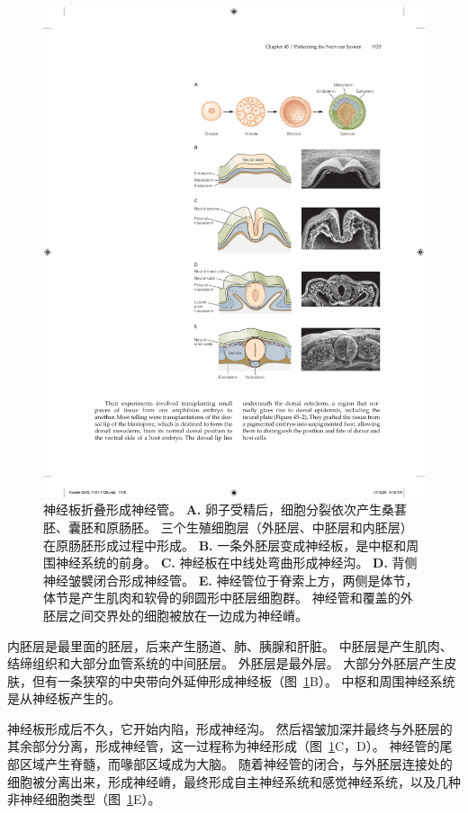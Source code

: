 \begin{figure}[htbp]
	\centering
	\includegraphics[width=0.8\linewidth]{chap45/fig_45_1}
	\caption{神经板折叠形成神经管。
		\textbf{A.} 卵子受精后，细胞分裂依次产生桑葚胚、囊胚和原肠胚。
		三个生殖细胞层（外胚层、中胚层和内胚层）在原肠胚形成过程中形成。
		\textbf{B.} 一条外胚层变成神经板，是中枢和周围神经系统的前身。
		\textbf{C.} 神经板在中线处弯曲形成神经沟。
		\textbf{D.} 背侧神经皱襞闭合形成神经管。
		\textbf{E.} 神经管位于脊索上方，两侧是体节，体节是产生肌肉和软骨的卵圆形中胚层细胞群。
		神经管和覆盖的外胚层之间交界处的细胞被放在一边成为神经嵴。}
	\label{fig:45_1}
\end{figure}


内胚层是最里面的胚层，后来产生肠道、肺、胰腺和肝脏。
中胚层是产生肌肉、结缔组织和大部分血管系统的中间胚层。
外胚层是最外层。
大部分外胚层产生皮肤，但有一条狭窄的中央带向外延伸形成神经板（图~\ref{fig:45_1}B）。
中枢和周围神经系统是从神经板产生的。


神经板形成后不久，它开始内陷，形成神经沟。
然后褶皱加深并最终与外胚层的其余部分分离，形成神经管，这一过程称为神经形成（图~\ref{fig:45_1}C，D）。
神经管的尾部区域产生脊髓，而喙部区域成为大脑。
随着神经管的闭合，与外胚层连接处的细胞被分离出来，形成神经嵴，最终形成自主神经系统和感觉神经系统，以及几种非神经细胞类型（图~\ref{fig:45_1}E）。



